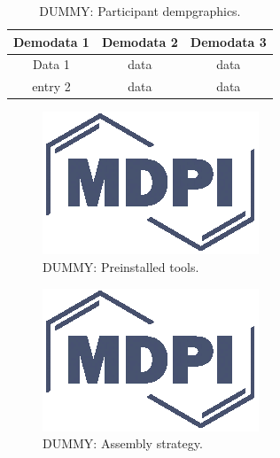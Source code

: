 \documentclass[genes, moreauthors]{Definitions/mdpi}
\begin{document}
  \begin{table}
    \caption{DUMMY: Participant dempgraphics. \label{fig:participants}}
    \centering
    \begin{tabular}{ccc}
    \toprule
    \textbf{Demodata 1}  & \textbf{Demodata 2}  & \textbf{Demodata 3} \\\midrule
                Data 1   & data                 & data                \\
               entry 2   & data                 & data                \\
    \bottomrule
    \end{tabular}
  \end{table}

  \begin{figure}
    \centering
    \includegraphics{Definitions/logo-mdpi}
    \caption{DUMMY: Preinstalled tools.
            \label{fig:preinstalled_tools}}
  \end{figure}

  \begin{figure}
    \centering
    \includegraphics{Definitions/logo-mdpi}
    \caption{DUMMY: Assembly strategy.
            \label{fig:asm_strategy}}
  \end{figure}
\end{document}
